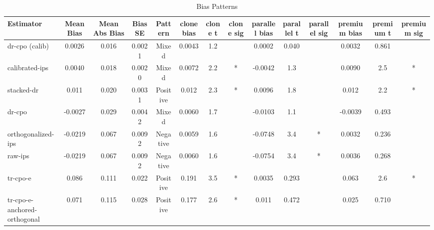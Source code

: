 \begin{table}[htbp]
\centering
\caption{Bias Patterns}
\label{tab:A2}
\begin{tabular}{l|ccccccccccccc}
\toprule
Estimator & Mean Bias & Mean Abs Bias & Bias SE & Pattern & clone bias & clone t & clone sig & parallel bias & parallel t & parallel sig & premium bias & premium t & premium sig \\
\midrule
dr-cpo (calib) & 0.0026 & 0.016 & 0.0021 & Mixed & 0.0043 & 1.2 &  & 0.0002 & 0.040 &  & 0.0032 & 0.861 &  \\
calibrated-ips & 0.0040 & 0.018 & 0.0020 & Mixed & 0.0072 & 2.2 & * & -0.0042 & 1.3 &  & 0.0090 & 2.5 & * \\
stacked-dr & 0.011 & 0.020 & 0.0031 & Positive & 0.012 & 2.3 & * & 0.0096 & 1.8 &  & 0.012 & 2.2 & * \\
dr-cpo & -0.0027 & 0.029 & 0.0042 & Mixed & 0.0060 & 1.7 &  & -0.0103 & 1.1 &  & -0.0039 & 0.493 &  \\
orthogonalized-ips & -0.0219 & 0.067 & 0.0092 & Negative & 0.0059 & 1.6 &  & -0.0748 & 3.4 & * & 0.0032 & 0.236 &  \\
raw-ips & -0.0219 & 0.067 & 0.0092 & Negative & 0.0060 & 1.6 &  & -0.0754 & 3.4 & * & 0.0036 & 0.268 &  \\
tr-cpo-e & 0.086 & 0.111 & 0.022 & Positive & 0.191 & 3.5 & * & 0.0035 & 0.293 &  & 0.063 & 2.6 & * \\
tr-cpo-e-anchored-orthogonal & 0.071 & 0.115 & 0.028 & Positive & 0.177 & 2.6 & * & 0.011 & 0.472 &  & 0.025 & 0.710 &  \\
\bottomrule
\end{tabular}
\end{table}